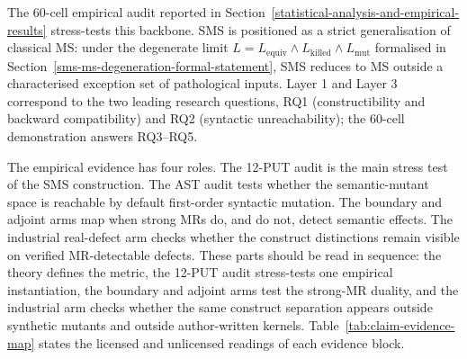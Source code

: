 \documentclass[review,12pt,authoryear]{elsarticle}
\begin{document}
The 60-cell empirical audit reported in Section~\ref{statistical-analysis-and-empirical-results} stress-tests this
backbone. SMS is positioned as a strict generalisation of classical MS:
under the
degenerate limit $L = L_{\mathrm{equiv}} \wedge L_{\mathrm{killed}} \wedge L_{\mathrm{mut}}$
formalised in Section~\ref{sms-ms-degeneration-formal-statement}, SMS reduces to MS outside a
characterised exception set of pathological inputs. Layer 1 and
Layer 3 correspond to the two leading research questions, RQ1
(constructibility and backward compatibility) and RQ2 (syntactic
unreachability); the 60-cell demonstration answers RQ3--RQ5.

The empirical evidence has four roles. The 12-PUT audit is the main
stress test of the SMS construction. The AST audit tests whether the
semantic-mutant space is reachable by default first-order syntactic
mutation. The boundary and adjoint arms map when strong MRs do, and do
not, detect semantic effects. The industrial real-defect arm checks whether
the construct distinctions remain visible on verified MR-detectable defects.
These parts should be read in sequence: the theory defines the metric,
the 12-PUT audit stress-tests one empirical instantiation, the boundary
and adjoint arms test the strong-MR duality, and the industrial arm
checks whether the same construct separation appears outside synthetic
mutants and outside author-written kernels.
Table~\ref{tab:claim-evidence-map} states the licensed and unlicensed
readings of each evidence block.
\end{document}
